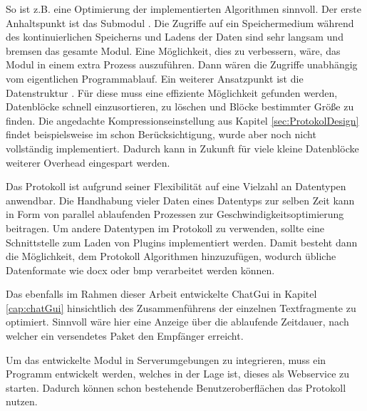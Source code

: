 So ist z.B. eine Optimierung der implementierten Algorithmen sinnvoll.
Der erste Anhaltspunkt ist das Submodul .
Die Zugriffe auf ein Speichermedium während des kontinuierlichen Speicherns und
Ladens der Daten sind sehr langsam und bremsen das gesamte Modul. Eine
Möglichkeit, dies zu verbessern, wäre, das Modul in einem extra Prozess
auszuf{\"u}hren. Dann wären die Zugriffe unabhängig vom eigentlichen
Programmablauf. Ein weiterer Ansatzpunkt ist die Datenstruktur
. Für diese muss eine effiziente Möglichkeit
gefunden werden, Datenblöcke schnell einzusortieren, zu löschen und Bl{\"o}cke
bestimmter Größe zu finden.
Die angedachte Kompressionseinstellung aus Kapitel \ref{sec:ProtokolDesign}
findet beispielsweise im  schon Berücksichtigung, wurde aber
noch nicht vollständig implementiert. Dadurch kann in Zukunft für viele kleine
Datenblöcke weiterer Overhead eingespart werden.

Das Protokoll ist aufgrund seiner Flexibilität auf eine Vielzahl an Datentypen
anwendbar. Die Handhabung vieler Daten eines Datentyps zur selben Zeit kann
in Form von parallel ablaufenden Prozessen zur Geschwindigkeitsoptimierung
beitragen. Um andere Datentypen im Protokoll zu verwenden, sollte eine
Schnittstelle zum Laden von Plugins implementiert werden. Damit besteht dann die
Möglichkeit, dem Protokoll Algorithmen hinzuzufügen, wodurch
übliche Datenformate wie docx oder bmp verarbeitet werden können.

Das ebenfalls im Rahmen dieser Arbeit entwickelte ChatGui in Kapitel
\ref{cap:chatGui} hinsichtlich des Zusammenführens der einzelnen Textfragmente
zu optimiert. Sinnvoll wäre hier eine Anzeige über die ablaufende Zeitdauer,
nach welcher ein versendetes Paket den Empfänger erreicht.

Um das entwickelte Modul in Serverumgebungen zu integrieren, muss ein Programm
entwickelt werden, welches in der Lage ist, dieses als Webservice zu starten.
Dadurch können schon bestehende Benutzeroberflächen das Protokoll nutzen.
